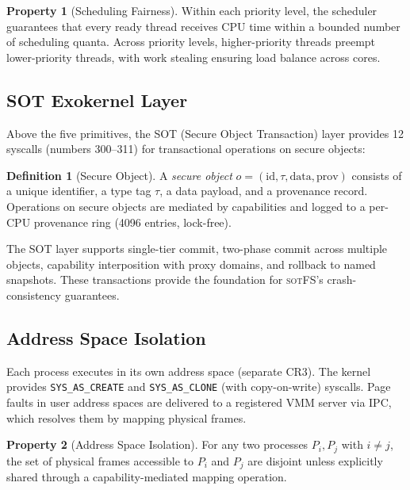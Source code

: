 \documentclass[11pt,a4paper]{article}
\theoremstyle{definition}
\newtheorem{definition}{Definition}[section]
\newtheorem{property}{Property}[section]
\theoremstyle{remark}
\newcommand{\sotfs}{\textsc{sotFS}}
\begin{document}
\begin{property}[Scheduling Fairness]
\label{prop:sched-fairness}
Within each priority level, the scheduler guarantees that every
ready thread receives CPU time within a bounded number of scheduling
quanta. Across priority levels, higher-priority threads preempt
lower-priority threads, with work stealing ensuring load balance
across cores.
\end{property}

\subsection{SOT Exokernel Layer}
\label{sec:arch-sot}

Above the five primitives, the SOT (Secure Object Transaction) layer
provides 12 syscalls (numbers 300--311) for transactional operations on
secure objects:

\begin{definition}[Secure Object]
\label{def:sot}
A \emph{secure object} $o = (\mathrm{id}, \tau, \mathrm{data},
\mathrm{prov})$ consists of a unique identifier, a type tag $\tau$, a
data payload, and a provenance record. Operations on secure objects are
mediated by capabilities and logged to a per-CPU provenance ring
(4096 entries, lock-free).
\end{definition}

The SOT layer supports single-tier commit, two-phase commit across
multiple objects, capability interposition with proxy domains, and
rollback to named snapshots. These transactions provide the foundation
for \sotfs{}'s crash-consistency guarantees.

\subsection{Address Space Isolation}
\label{sec:arch-as}

Each process executes in its own address space (separate CR3). The
kernel provides \texttt{SYS\_AS\_CREATE} and \texttt{SYS\_AS\_CLONE}
(with copy-on-write) syscalls. Page faults in user address spaces are
delivered to a registered VMM server via IPC, which resolves them by
mapping physical frames.

\begin{property}[Address Space Isolation]
\label{prop:as-isolation}
For any two processes $P_i, P_j$ with $i \neq j$, the set of physical
frames accessible to $P_i$ and $P_j$ are disjoint unless explicitly
shared through a capability-mediated mapping operation.
\end{property}
\end{document}
